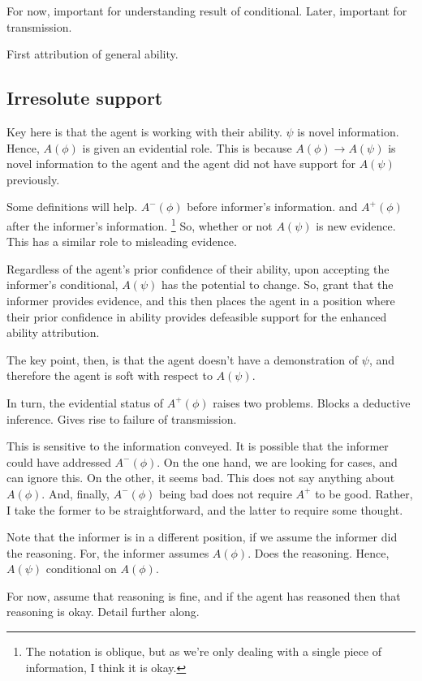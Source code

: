 \documentclass[10pt]{article}
\begin{document}
For now, important for understanding result of conditional.
Later, important for transmission.

First attribution of general ability.

\subsection{Irresolute support}
\label{sec:evidential-role}

\begin{note}
Key here is that the agent is working with their ability.
\(\psi\) is novel information.
Hence, \(A(\phi)\) is given an evidential role.
This is because \(A(\phi) \rightarrow A(\psi)\) is novel information to the agent and the agent did not have support for \(A(\psi)\) previously.

Some definitions will help.
\(A^{-}(\phi)\) before informer's information.
and
\(A^{+}(\phi)\) after the informer's information.\nolinebreak
\footnote{
  The notation is oblique, but as we're only dealing with a single piece of information, I think it is okay.
}
So, whether or not \(A(\psi)\) is new evidence.
This has a similar role to misleading evidence.

Regardless of the agent's prior confidence of their ability, upon accepting the informer's conditional, \(A(\psi)\) has the potential to change.
So, grant that the informer provides evidence, and this then places the agent in a position where their prior confidence in ability provides defeasible support for the enhanced ability attribution.

The key point, then, is that the agent doesn't have a demonstration of \(\psi\), and therefore the agent is soft with respect to \(A(\psi)\).

In turn, the evidential status of \(A^{+}(\phi)\) raises two problems.
Blocks a deductive inference.
Gives rise to failure of transmission.

This is sensitive to the information conveyed.
It is possible that the informer could have addressed \(A^{-}(\phi)\).
On the one hand, we are looking for cases, and can ignore this.
On the other, it seems bad.
This does not say anything about \(A(\phi)\).
And, finally, \(A^{-}(\phi)\) being bad does not require \(A^{+}\) to be good.
Rather, I take the former to be straightforward, and the latter to require some thought.
\end{note}

\begin{note}
  Note that the informer is in a different position, if we assume the informer did the reasoning.
  For, the informer assumes \(A(\phi)\).
  Does the reasoning.
  Hence, \(A(\psi)\) conditional on \(A(\phi)\).

  For now, assume that reasoning is fine, and if the agent has reasoned then that reasoning is okay.
  Detail further along.
\end{note}
\end{document}

